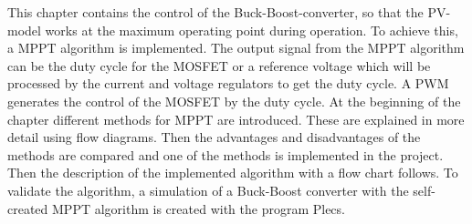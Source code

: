 This chapter contains the control of the Buck-Boost-converter, so that the PV-model works at the maximum operating point during operation. To achieve this, a MPPT algorithm is implemented. The output signal from the MPPT algorithm can be the duty cycle for the MOSFET or a reference voltage which will be processed by the current and voltage regulators to get the duty cycle. A PWM generates the control of the MOSFET by the duty cycle. At the beginning of the chapter different methods for MPPT are introduced. These are explained in more detail using flow diagrams. Then the advantages and disadvantages of the methods are compared and one of the methods is implemented in the project. Then the description of the implemented algorithm with a flow chart follows. To validate the algorithm, a simulation of a Buck-Boost converter with the self-created MPPT algorithm is created with the program Plecs.